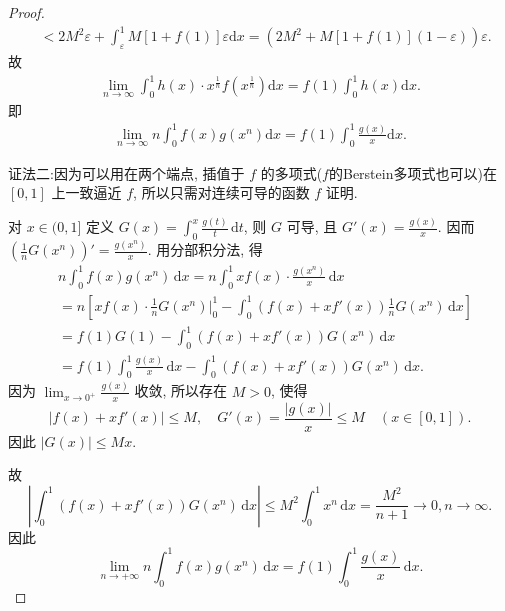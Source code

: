 \documentclass[../../main.tex]{subfiles}%
\begin{document}
\begin{proof}
\begin{align*}
&<2M^2\varepsilon+\int_{\varepsilon}^1 M\left[1+f(1)\right]\varepsilon\mathrm{d}x=\left(2M^2+M\left[1+f(1)\right]\left(1-\varepsilon\right)\right)\varepsilon.
\end{align*}
故
\begin{align*}
\lim\limits_{n\rightarrow \infty}\int_0^1 h(x)\cdot x^{\frac{1}{n}}f\left(x^{\frac{1}{n}}\right)\mathrm{d}x=f(1)\int_0^1 h(x)\mathrm{d}x.
\end{align*}
即
\begin{align*}
\lim_{n\rightarrow \infty}n\int_0^1 f(x)g(x^n)\mathrm{d}x=f(1)\int_0^1 \frac{g(x)}{x}\mathrm{d}x.
\end{align*}

{\color{blue}证法二:}因为可以用在两个端点, 插值于 \( f \) 的多项式($f$的Berstein多项式也可以)在 \([0,1]\) 上一致逼近 \( f \), 所以只需对连续可导的函数 \( f \) 证明.

对 \( x \in (0,1] \) 定义 \( G(x) = \int_{0}^{x} \frac{g(t)}{t} \, \mathrm{d}t \), 则 \( G \) 可导, 且 \( G'(x) = \frac{g(x)}{x} \). 因而 \( \left( \frac{1}{n} G(x^n) \right)' = \frac{g(x^n)}{x} \). 用分部积分法, 得
\[
\begin{aligned}
&n \int_{0}^{1} f(x) g(x^n) \, \mathrm{d}x = n \int_{0}^{1} x f(x) \cdot \frac{g(x^n)}{x} \, \mathrm{d}x \\
&= n \left[ x f(x) \cdot \frac{1}{n} G(x^n) \bigg|_{0}^{1} - \int_{0}^{1} \left( f(x) + x f'(x) \right) \frac{1}{n} G(x^n) \, \mathrm{d}x \right] \\
&= f(1) G(1) - \int_{0}^{1} \left( f(x) + x f'(x) \right) G(x^n) \, \mathrm{d}x \\
&= f(1) \int_{0}^{1} \frac{g(x)}{x} \, \mathrm{d}x - \int_{0}^{1} \left( f(x) + x f'(x) \right) G(x^n) \, \mathrm{d}x.
\end{aligned}
\]
因为 \( \lim_{x \to 0^+} \frac{g(x)}{x} \) 收敛, 所以存在 \( M > 0 \), 使得
\[
|f(x) + x f'(x)| \leqslant M, \quad G'(x)=\frac{|g(x)|}{x} \leqslant M \quad (x \in [0,1]).
\]
因此 \( |G(x)| \leqslant M x \).

故
\[
\left| \int_{0}^{1} \left( f(x) + x f'(x) \right) G(x^n) \, \mathrm{d}x \right| \leqslant M^2 \int_{0}^{1} x^n \, \mathrm{d}x = \frac{M^2}{n + 1}\to 0,n\to \infty.
\]
因此
\[
\lim_{n \to +\infty} n \int_{0}^{1} f(x) g(x^n) \, \mathrm{d}x = f(1) \int_{0}^{1} \frac{g(x)}{x} \, \mathrm{d}x.
\]

\end{proof}
\end{document}
